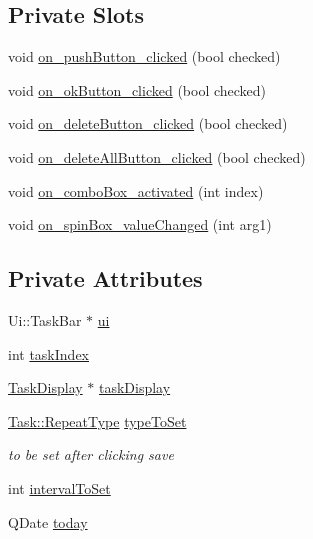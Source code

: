\subsection*{Private Slots}
\begin{DoxyCompactItemize}
\item 
void \hyperlink{classTaskBar_acf2c1f19d61d67bb3c078c263042012a}{on\+\_\+push\+Button\+\_\+clicked} (bool checked)
\item 
void \hyperlink{classTaskBar_a2b2c67c68a830705af3c568b2e005d4d}{on\+\_\+ok\+Button\+\_\+clicked} (bool checked)
\item 
void \hyperlink{classTaskBar_adeb4b20f6055736acc7a042698c337ff}{on\+\_\+delete\+Button\+\_\+clicked} (bool checked)
\item 
void \hyperlink{classTaskBar_ab3127214b1aa8e3886f77b7b9c11f19e}{on\+\_\+delete\+All\+Button\+\_\+clicked} (bool checked)
\item 
void \hyperlink{classTaskBar_a10bf9a5d0649e13e395e04717c0b1490}{on\+\_\+combo\+Box\+\_\+activated} (int index)
\item 
void \hyperlink{classTaskBar_ab187953b1f39520cfb1b0792850bbfe8}{on\+\_\+spin\+Box\+\_\+value\+Changed} (int arg1)
\end{DoxyCompactItemize}
\subsection*{Private Attributes}
\begin{DoxyCompactItemize}
\item 
Ui\+::\+Task\+Bar $\ast$ \hyperlink{classTaskBar_adf231c032cb316cc500191fa349de0c8}{ui}
\item 
int \hyperlink{classTaskBar_a3207c8756b34796b9670f7cdc90bd121}{task\+Index}
\item 
\hyperlink{classTaskDisplay}{Task\+Display} $\ast$ \hyperlink{classTaskBar_ad0eb90c40336ebb502c31c8389c38bf0}{task\+Display}
\item 
\hyperlink{classTask_a93fe2c7346381e2e631fb2ba63ac0344}{Task\+::\+Repeat\+Type} \hyperlink{classTaskBar_a84684467e8038096bee94cdd1f26180c}{type\+To\+Set}
\begin{DoxyCompactList}\small\item\em to be set after clicking save \end{DoxyCompactList}\item 
int \hyperlink{classTaskBar_a4eb8a4530ebcb300192bb41013a91a1c}{interval\+To\+Set}
\item 
Q\+Date \hyperlink{classTaskBar_ab2cdbd96df84313d9de6e86fd968e374}{today}
\end{DoxyCompactItemize}

